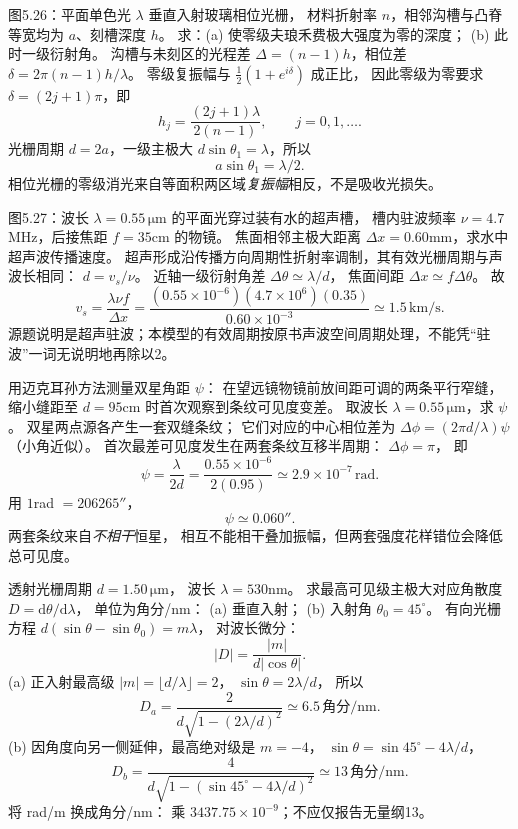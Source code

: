图5.26：平面单色光 $\lambda$ 垂直入射玻璃相位光栅，
材料折射率 $n$，相邻沟槽与凸脊等宽均为 $a$、刻槽深度 $h$。
求：(a) 使零级夫琅禾费极大强度为零的深度；
(b) 此时一级衍射角。
\exsolution
沟槽与未刻区的光程差
$\Delta=(n-1)h$，相位差
$\delta=2\pi(n-1)h/\lambda$。
零级复振幅与
$\tfrac12(1+e^{i\delta})$ 成正比，
因此零级为零要求
$\delta=(2j+1)\pi$，即
\[
\boxed{h_j=\frac{(2j+1)\lambda}{2(n-1)}},\qquad j=0,1,\ldots.
\]
光栅周期 $d=2a$，一级主极大
$d\sin\theta_1=\lambda$，所以
\[
\boxed{a\sin\theta_1=\lambda/2}.
\]
\excheck 相位光栅的零级消光来自等面积两区域\emph{复振幅}相反，不是吸收光损失。

图5.27：波长
$\lambda=0.55\,\mathrm{\mu m}$ 的平面光穿过装有水的超声槽，
槽内驻波频率
$\nu=4.7$MHz，后接焦距
$f=35$cm 的物镜。
焦面相邻主极大距离
$\Delta x=0.60$mm，求水中超声波传播速度。
\exsolution
超声形成沿传播方向周期性折射率调制，其有效光栅周期与声波长相同：
$d=v_s/\nu$。
近轴一级衍射角差
$\Delta\theta\simeq\lambda/d$，
焦面间距
$\Delta x\simeq f\Delta\theta$。
故
\[
\boxed{v_s=\frac{\lambda\nu f}{\Delta x}}
=\frac{(0.55\times10^{-6})(4.7\times10^6)(0.35)}
{0.60\times10^{-3}}
\simeq1.5\,\mathrm{km/s}.
\]
\excheck 源题说明是超声驻波；本模型的有效周期按原书声波空间周期处理，不能凭“驻波”一词无说明地再除以2。

用迈克耳孙方法测量双星角距 $\psi$：
在望远镜物镜前放间距可调的两条平行窄缝，
缩小缝距至
$d=95$cm 时首次观察到条纹可见度变差。
取波长 $\lambda=0.55\,\mathrm{\mu m}$，求 $\psi$。
\exsolution
双星两点源各产生一套双缝条纹；
它们对应的中心相位差为
$\Delta\phi=(2\pi d/\lambda)\psi$
（小角近似）。
首次最差可见度发生在两套条纹互移半周期：
$\Delta\phi=\pi$，
即
\[
\boxed{\psi=\frac{\lambda}{2d}}
=\frac{0.55\times10^{-6}}{2(0.95)}
\simeq2.9\times10^{-7}\,\mathrm{rad}.
\]
用 $1$rad $=206265''$，
\[
\boxed{\psi\simeq0.060''}.
\]
\excheck 两套条纹来自\emph{不相干}恒星，
相互不能相干叠加振幅，但两套强度花样错位会降低总可见度。

透射光栅周期
$d=1.50\,\mathrm{\mu m}$，
波长 $\lambda=530$nm。
求最高可见级主极大对应角散度
$D=\mathrm d\theta/\mathrm d\lambda$，
单位为角分/nm：
(a) 垂直入射；
(b) 入射角 $\theta_0=45^\circ$。
\exsolution
有向光栅方程
$d(\sin\theta-\sin\theta_0)=m\lambda$，
对波长微分：
\[
\boxed{|D|=\frac{|m|}{d|\cos\theta|}}.
\]
(a) 正入射最高级
$|m|=\lfloor d/\lambda\rfloor=2$，
$\sin\theta=2\lambda/d$，
所以
\[
\boxed{D_a=
\frac2{d\sqrt{1-(2\lambda/d)^2}}
\simeq6.5\,\text{角分/nm}}.
\]
(b) 因角度向另一侧延伸，最高绝对级是
$m=-4$，
$\sin\theta=\sin45^\circ-4\lambda/d$，
\[
\boxed{D_b=
\frac4{d\sqrt{1-(\sin45^\circ-4\lambda/d)^2}}
\simeq13\,\text{角分/nm}}.
\]
\excheck 将 rad/m 换成角分/nm：
乘 $3437.75\times10^{-9}$；不应仅报告无量纲13。

